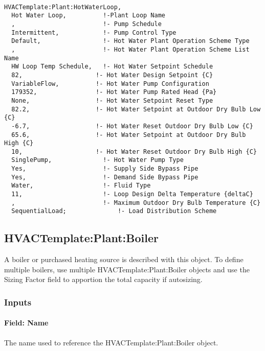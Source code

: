 \begin{lstlisting}

HVACTemplate:Plant:HotWaterLoop,
  Hot Water Loop,          !-Plant Loop Name
  ,                        !- Pump Schedule
  Intermittent,            !- Pump Control Type
  Default,                 !- Hot Water Plant Operation Scheme Type
  ,                        !- Hot Water Plant Operation Scheme List Name
  HW Loop Temp Schedule,   !- Hot Water Setpoint Schedule
  82,                    !- Hot Water Design Setpoint {C}
  VariableFlow,          !- Hot Water Pump Configuration
  179352,                !- Hot Water Pump Rated Head {Pa}
  None,                  !- Hot Water Setpoint Reset Type
  82.2,                  !- Hot Water Setpoint at Outdoor Dry Bulb Low {C}
  -6.7,                  !- Hot Water Reset Outdoor Dry Bulb Low {C}
  65.6,                  !- Hot Water Setpoint at Outdoor Dry Bulb High {C}
  10,                    !- Hot Water Reset Outdoor Dry Bulb High {C}
  SinglePump,              !- Hot Water Pump Type
  Yes,                     !- Supply Side Bypass Pipe
  Yes,                     !- Demand Side Bypass Pipe
  Water,                   !- Fluid Type
  11,                      !- Loop Design Delta Temperature {deltaC}
  ,                        !- Maximum Outdoor Dry Bulb Temperature {C}
  SequentialLoad;              !- Load Distribution Scheme
\end{lstlisting}

\subsection{HVACTemplate:Plant:Boiler}\label{hvactemplateplantboiler}

A boiler or purchased heating source is described with this object. To define multiple boilers, use multiple HVACTemplate:Plant:Boiler objects and use the Sizing Factor field to apportion the total capacity if autosizing.

\subsubsection{Inputs}\label{inputs-29-000}

\paragraph{Field: Name}\label{field-name-16-003}

The name used to reference the HVACTemplate:Plant:Boiler object.

